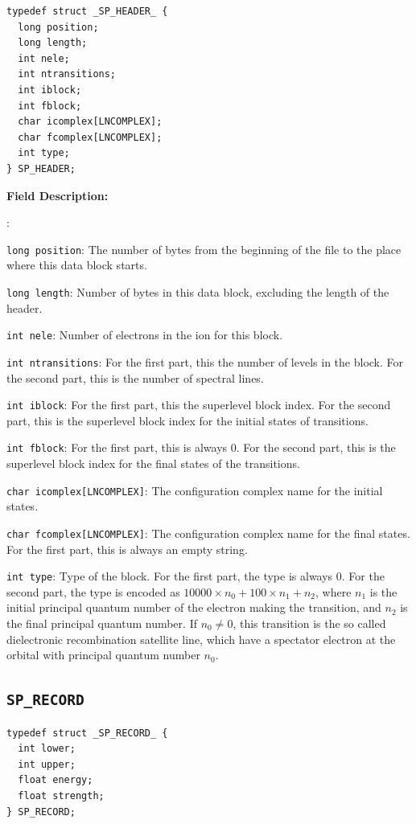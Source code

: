 \documentclass[twoside,letterpaper]{refrep}
\newenvironment{dbdesc}{\textbf{Field Description:} \begin{list}
	{:}{\setlength{\labelwidth}{2in}
	   \setlength{\leftmargin}{2in}
	   \setlength{\labelsep}{0.1in}
	   \setlength{\rightmargin}{0.2in}}}
	{\end{list}}
\begin{document}
\begin{verbatim}
typedef struct _SP_HEADER_ { 
  long position;
  long length;
  int nele;
  int ntransitions;
  int iblock;
  int fblock;
  char icomplex[LNCOMPLEX];
  char fcomplex[LNCOMPLEX];
  int type;
} SP_HEADER;
\end{verbatim}

\begin{dbdesc}
\item[\texttt{long position}:] The number of bytes from the beginning of the
file to the place where this data block starts.
\item[\texttt{long length}:] Number of bytes in this data block, excluding the
length of the header.
\item[\texttt{int nele}:] Number of electrons in the ion for this block.
\item[\texttt{int ntransitions}:] For the first part, this the number of
levels in the block. For the second part, this is the number of spectral lines.
\item[\texttt{int iblock}:] For the first part, this the superlevel block
index. For the second part, this is the superlevel block index for the initial
states of transitions.
\item[\texttt{int fblock}:] For the first part, this is always 0. For the
second part, this is the superlevel block index for the final states of the
transitions.
\item[\texttt{char icomplex[LNCOMPLEX]}:] The configuration complex name for
the initial states. 
\item[\texttt{char fcomplex[LNCOMPLEX]}:] The configuration complex name for
the final states. For the first part, this is always an empty string.
\item[\texttt{int type}:] Type of the block. For the first part, the type is
always 0. For the second part, the type is encoded as $10000\times n_0 +
100\times n_1 + n_2$, where $n_1$ is the initial principal quantum number of
the electron making the transition, and $n_2$ is the final principal quantum
number. If $n_0 \ne 0$, this transition is the so called dielectronic
recombination satellite line, which have a spectator electron at the orbital
with principal quantum number $n_0$.
\end{dbdesc}

\subsection{\texttt{SP\_RECORD}}
\begin{verbatim}
typedef struct _SP_RECORD_ {
  int lower;
  int upper;
  float energy;
  float strength;
} SP_RECORD;
\end{verbatim}
\end{document}
